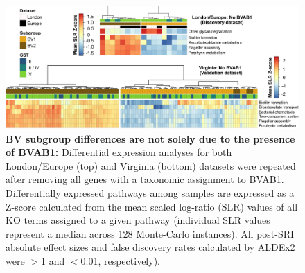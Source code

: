 \documentclass[sn-mathphys,Numbered]{sn-jnl}%
\begin{document}
\begin{figure}[H]
    \centering
    \includegraphics[scale = 0.745]{0_supplFig3.png}
    \caption{\textbf{BV subgroup differences are not solely due to the presence of BVAB1:} Differential expression analyses for both London/Europe (top) and Virginia (bottom) datasets were repeated after removing all genes with a taxonomic assignment to BVAB1. Differentially expressed pathways among samples are expressed as a Z-score calculated from the mean scaled log-ratio (SLR) values of all KO terms assigned to a given pathway (individual SLR values represent a median across 128 Monte-Carlo instances). All post-SRI absolute effect sizes and false discovery rates calculated by ALDEx2 were $>$1 and $<$0.01, respectively). } \label{sig:sfigNoBVAB1}
\end{figure}
\newpage
\end{document}
